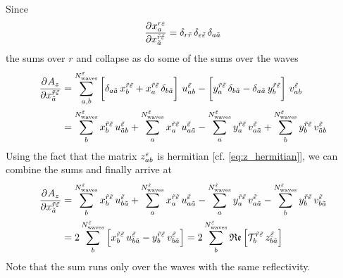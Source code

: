 Since
\begin{equation}
  \label{eq:likelihood_function_par_deriv}
  \dpd{x_a^{r \refl}}{{x_{\tilde{a}}^{\tilde{r} \tilde{\refl}}}}
  = \delta_{r \tilde{r}}\, \delta_{\refl \tilde{\refl}}\, \delta_{a \tilde{a}}
\end{equation}
the sums over $r$ and  collapse as do some of the sums over the waves
\begin{align}
  \dpd{A_z}{{x_{\tilde{a}}^{\tilde{r} \tilde{\refl}}}}
  &= \sum_{a, b}^{N^{\tilde{\refl}}_\text{waves}}
  \sBrk[3]{\delta_{a \tilde{a}}\, x_b^{\tilde{r} \tilde{\refl}}
    + x_a^{\tilde{r} \tilde{\refl}}\, \delta_{b \tilde{a}}}\, u^{\tilde{\refl}}_{a b}
  - \sBrk[3]{y_a^{\tilde{r} \tilde{\refl}}\, \delta_{b \tilde{a}}
    - \delta_{a \tilde{a}}\, y_b^{\tilde{r} \tilde{\refl}}}\, v^{\tilde{\refl}}_{a b} \\
  &= \sum_{b}^{N^{\tilde{\refl}}_\text{waves}} x_b^{\tilde{r} \tilde{\refl}}\, u^{\tilde{\refl}}_{\tilde{a} b}
    + \sum_{a}^{N^{\tilde{\refl}}_\text{waves}} x_a^{\tilde{r} \tilde{\refl}}\, u^{\tilde{\refl}}_{a \tilde{a}}
  - \sum_{a}^{N^{\tilde{\refl}}_\text{waves}} y_a^{\tilde{r} \tilde{\refl}}\, v^{\tilde{\refl}}_{a \tilde{a}}
    + \sum_{b}^{N^{\tilde{\refl}}_\text{waves}} y_b^{\tilde{r} \tilde{\refl}}\, v^{\tilde{\refl}}_{\tilde{a} b} \\
\end{align}
Using the fact that the matrix $z^\varepsilon_{a b}$ is hermitian
[cf. \cref{eq:z_hermitian}], we can combine the sums and finally arrive
at
\begin{align}
  \dpd{A_z}{{x_{\tilde{a}}^{\tilde{r} \tilde{\refl}}}}
  &= \sum_{b}^{N^{\tilde{\refl}}_\text{waves}} x_b^{\tilde{r} \tilde{\refl}}\, u^{\tilde{\refl}}_{b \tilde{a}}
    + \sum_{a}^{N^{\tilde{\refl}}_\text{waves}} x_a^{\tilde{r} \tilde{\refl}}\, u^{\tilde{\refl}}_{a \tilde{a}}
  - \sum_{a}^{N^{\tilde{\refl}}_\text{waves}} y_a^{\tilde{r} \tilde{\refl}}\, v^{\tilde{\refl}}_{a \tilde{a}}
    - \sum_{b}^{N^{\tilde{\refl}}_\text{waves}} y_b^{\tilde{r} \tilde{\refl}}\, v^{\tilde{\refl}}_{b \tilde{a}} \\
  \label{eq:likelihood_function_sum_term_re_deriv}
  &= 2 \sum_b^{N^{\tilde{\refl}}_\text{waves}} \sBrk{x_b^{\tilde{r} \tilde{\refl}}\, u^{\tilde{\refl}}_{b \tilde{a}}
    - y_b^{\tilde{r} \tilde{\refl}}\, v^{\tilde{\refl}}_{b \tilde{a}}}
  = 2 \sum_b^{N^{\tilde{\refl}}_\text{waves}} \Re\sBrk{\mathcal{T}_b^{\tilde{r} \tilde{\refl}}\, z^{\tilde{\refl}}_{b \tilde{a}}}
\end{align}
Note that the sum runs only over the waves with the same reflectivity.

